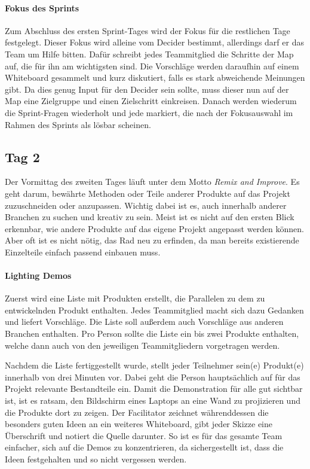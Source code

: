 \paragraph{Fokus des Sprints}
Zum Abschluss des ersten Sprint-Tages wird der Fokus für die restlichen Tage festgelegt. Dieser Fokus wird alleine vom Decider bestimmt, allerdings darf er das Team um Hilfe bitten. Dafür schreibt jedes Teammitglied die Schritte der Map auf, die für ihn am wichtigsten sind. Die Vorschläge werden daraufhin auf einem Whiteboard gesammelt und kurz diskutiert, falls es stark abweichende Meinungen gibt. Da dies genug Input für den Decider sein sollte, muss dieser nun auf der Map eine Zielgruppe und einen Zielschritt einkreisen. Danach werden wiederum die Sprint-Fragen wiederholt und jede markiert, die nach der Fokusauswahl im Rahmen des Sprints als lösbar scheinen.

\subsection*{Tag 2}
Der Vormittag des zweiten Tages läuft unter dem Motto \textit{Remix and Improve}. Es geht darum, bewährte Methoden oder Teile anderer Produkte auf das Projekt zuzuschneiden oder anzupassen. Wichtig dabei ist es, auch innerhalb anderer Branchen zu suchen und kreativ zu sein. Meist ist es nicht auf den ersten Blick erkennbar, wie andere Produkte auf das eigene Projekt angepasst werden können. Aber oft ist es nicht nötig, das Rad neu zu erfinden, da man bereits existierende Einzelteile einfach passend einbauen muss.

\paragraph{Lighting Demos}
Zuerst wird eine Liste mit Produkten erstellt, die Parallelen zu dem zu entwickelnden Produkt enthalten. Jedes Teammitglied macht sich dazu Gedanken und liefert Vorschläge. Die Liste soll außerdem auch Vorschläge aus anderen Branchen enthalten. Pro Person sollte die Liste ein bis zwei Produkte enthalten, welche dann auch von den jeweiligen Teammitgliedern vorgetragen werden.

Nachdem die Liste fertiggestellt wurde, stellt jeder Teilnehmer sein(e) Produkt(e) innerhalb von drei Minuten vor. Dabei geht die Person hauptsächlich auf für das Projekt relevante Bestandteile ein. Damit die Demonstration für alle gut sichtbar ist, ist es ratsam, den Bildschirm eines Laptops an eine Wand zu projizieren und die Produkte dort zu zeigen. Der Facilitator zeichnet währenddessen die besonders guten Ideen an ein weiteres Whiteboard, gibt jeder Skizze eine Überschrift und notiert die Quelle darunter. So ist es für das gesamte Team einfacher, sich auf die Demos zu konzentrieren, da sichergestellt ist, dass die Ideen festgehalten und so nicht vergessen werden.

